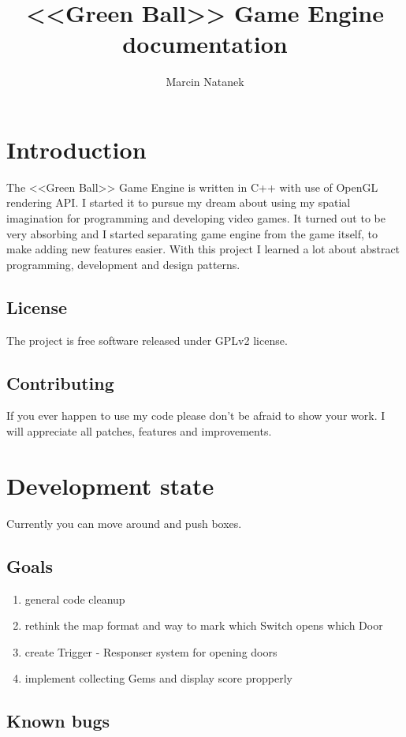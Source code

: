 \documentclass[11pt,a4paper,oneside]{report}
\title{<<Green Ball>> Game Engine documentation}
\author{Marcin Natanek}
\begin{document}
\maketitle
\pagebreak
\tableofcontents
\pagebreak

\chapter{Introduction}
The <<Green Ball>> Game Engine is written in C++ with use of OpenGL rendering API. I started it to pursue my dream about using my spatial imagination for programming and developing video games. It turned out to be very absorbing and I started separating game engine from the game itself, to make adding new features easier. With this project I learned a lot about abstract programming, development and design patterns.

\section{License}
The project is free software released under GPLv2 license.

\section{Contributing}
If you ever happen to use my code please don't be afraid to show your work. I will appreciate all patches, features and improvements.

\chapter{Development state}
Currently you can move around and push boxes.
\section{Goals}
\begin{enumerate}
	\item general code cleanup
	\item rethink the map format and way to mark which Switch opens which Door
	\item create Trigger - Responser system for opening doors
	\item implement collecting Gems and display score propperly
\end{enumerate}
\section{Known bugs}
\end{document}
